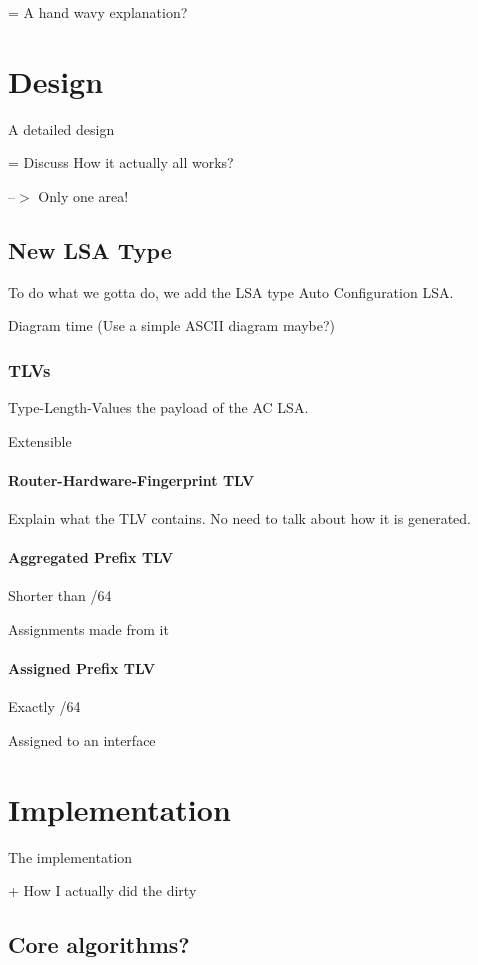 \documentclass[12pt]{report}
\begin{document}
= A hand wavy explanation?

\chapter{Design}
A detailed design

= Discuss How it actually all works?

--$>$ Only one area!

\section{New LSA Type}
To do what we gotta do, we add the LSA type Auto Configuration LSA. 

Diagram time (Use a simple ASCII diagram maybe?)

\subsection{TLVs}

Type-Length-Values the payload of the AC LSA. 

Extensible

\subsubsection{Router-Hardware-Fingerprint TLV}

Explain what the TLV contains. No need to talk about how it is generated.

\subsubsection{Aggregated Prefix TLV}

Shorter than /64 

Assignments made from it

\subsubsection{Assigned Prefix TLV}

Exactly /64 

Assigned to an interface

\chapter{Implementation}
The implementation

+ How I actually did the dirty

\section{Core algorithms?}
\end{document}
